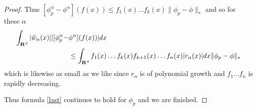 \begin{proof}
Thus $[\phi_p ^{\alpha} - \phi ^{\alpha}](f(x)) \leq f_1(x) \dots f_k (x)
\|\phi_p -\phi\|_{*}$ and so for these $\alpha$
\begin{eqnarray*}
\begin{aligned}
\int_{{\bf R}^d}
|\tilde{w}_{\alpha} (x) | |[\phi_p ^{\alpha} - &\phi ^{\alpha}]
(f(x))| dx\\
& \leq \int_{{\bf R}^d} f_1(x) \dots f_k (x) f_{k+1}(x) \dots f_n(x)
|r_\alpha (x)| dx
\| \phi_p - \phi \|_{*}
\end{aligned}
\end{eqnarray*}
which is likewise as small as we like since $r_{\alpha}$ is of polynomial
growth and $f_1 \dots f_n$ is rapidly decreasing.

Thus formula \eqref{last} continues to hold for $\phi_p$ and we are finished.
\end{proof}


